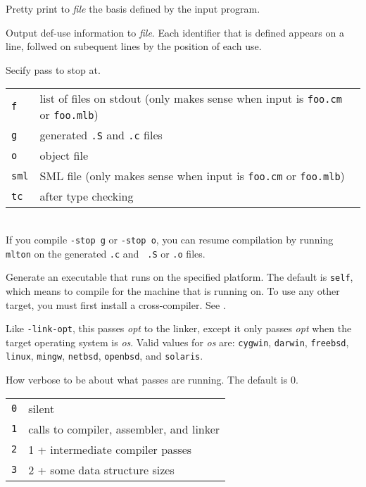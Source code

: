 \begin{description}
Pretty print to {\it file} the basis defined by the input program.

Output def-use information to {\it file}.  Each identifier that is
defined appears on a line, follwed on subequent lines by the position
of each use.

Secify pass to stop at.\\
\hspace*{0.5in}
\begin{tabular}{l|l}
\hline
{\tt f} & list of files on stdout (only makes sense when input is {\tt foo.cm} or {\tt foo.mlb})\\
{\tt g} & generated {\tt .S} and {\tt .c} files\\
{\tt o} & object file\\
{\tt sml} & SML file (only makes sense when input is {\tt foo.cm} or {\tt foo.mlb})\\
{\tt tc} & after type checking\\
\end{tabular}\\
If you compile {\tt -stop g} or {\tt -stop o}, you can resume
compilation by running {\tt mlton} on the generated {\tt .c} and {\tt
.S} or {\tt .o} files. 

Generate an executable that runs on the specified platform.  The default
is {\tt self}, which means to compile for the machine that {\mlton} is
running on.  To use any other target, you must first install a
cross-compiler.  See .

Like {\tt -link-opt}, this passes {\it opt} to the linker, except it
only passes {\it opt} when the target operating system is {\it os}.
Valid values for {\it os} are:
{\tt cygwin},
{\tt darwin},
{\tt freebsd},
{\tt linux},
{\tt mingw},
{\tt netbsd},
{\tt openbsd},
and {\tt solaris}.

How verbose to be about what passes are running.  The default is 0.\\
\hspace*{0.5in}
\begin{tabular}{l|l}
\hline
{\tt 0} & silent\\
{\tt 1} & calls to compiler, assembler, and linker\\
{\tt 2} & 1 + intermediate compiler passes\\
{\tt 3} & 2 + some data structure sizes\\
\end{tabular}\\

\end{description}

